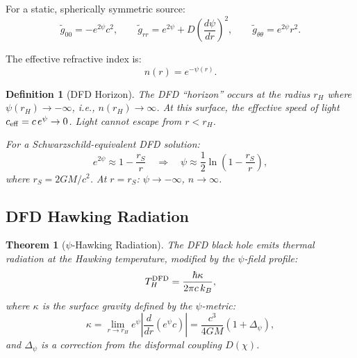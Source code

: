 \documentclass[11pt,a4paper]{article}
\newtheorem{theorem}{Theorem}
\newtheorem{definition}{Definition}
\begin{document}
For a static, spherically symmetric source:
\begin{equation}
\tilde{g}_{00} = -e^{2\psi}c^2, \qquad \tilde{g}_{rr} = e^{2\psi} + D\left(\frac{d\psi}{dr}\right)^2, \qquad \tilde{g}_{\theta\theta} = e^{2\psi}r^2.
\end{equation}

The effective refractive index is:
\begin{equation}
n(r) = e^{-\psi(r)}.
\end{equation}

\begin{definition}[DFD Horizon]
The DFD ``horizon'' occurs at the radius $r_H$ where $\psi(r_H) \to -\infty$, i.e., $n(r_H) \to \infty$. At this surface, the effective speed of light $c_{\rm eff} = c\,e^{\psi} \to 0$. Light cannot escape from $r < r_H$.

For a Schwarzschild-equivalent DFD solution:
\begin{equation}
e^{2\psi} \approx 1 - \frac{r_S}{r} \quad\Rightarrow\quad \psi \approx \frac{1}{2}\ln\left(1 - \frac{r_S}{r}\right),
\end{equation}
where $r_S = 2GM/c^2$. At $r = r_S$: $\psi \to -\infty$, $n \to \infty$.
\end{definition}

\subsection{DFD Hawking Radiation}

\begin{theorem}[$\psi$-Hawking Radiation]
\label{thm:Hawking}
The DFD black hole emits thermal radiation at the Hawking temperature, modified by the $\psi$-field profile:
\begin{equation}
T_H^{\rm DFD} = \frac{\hbar\kappa}{2\pi c\,k_B},
\end{equation}
where $\kappa$ is the surface gravity defined by the $\psi$-metric:
\begin{equation}
\kappa = \lim_{r\to r_H} e^{\psi}\left|\frac{d}{dr}\left(e^{\psi}c\right)\right| = \frac{c^3}{4GM}\left(1 + \Delta_\psi\right),
\end{equation}
and $\Delta_\psi$ is a correction from the disformal coupling $D(\chi)$.
\end{theorem}
\end{document}
